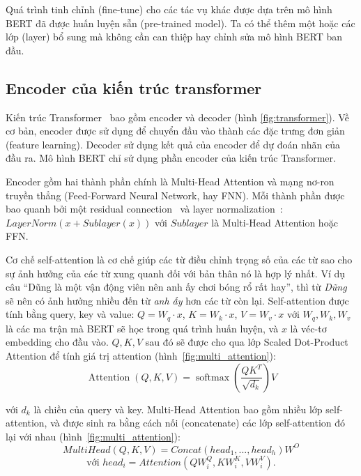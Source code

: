 Quá trình tinh chỉnh (fine-tune) cho các tác vụ khác được dựa trên mô hình BERT đã được huấn luyện sẵn (pre-trained model). Ta có thể thêm một hoặc các lớp (layer) bổ sung mà không cần can thiệp hay chỉnh sửa mô hình BERT ban đầu.

\subsection{Encoder của kiến trúc transformer} Kiến trúc
Transformer~\cite{vaswaniAttentionAllYou2017} bao gồm encoder và decoder (hình \ref{fig:transformer}). Về cơ bản, encoder được sử dụng để chuyển đầu vào thành các đặc trưng đơn giản (feature learning). Decoder sử dụng kết quả của encoder để dự đoán nhãn của đầu ra. Mô hình BERT chỉ sử dụng phần encoder của kiến trúc Transformer.


Encoder gồm hai thành phần chính là Multi-Head Attention và mạng nơ-ron truyền thẳng (Feed-Forward Neural Network, hay FNN). Mỗi thành phần được bao quanh bởi một residual connection~\cite{heDeepResidualLearning2016} và layer normalization~\cite{baLayerNormalization2016}: $LayerNorm(x + Sublayer(x))$ với $Sublayer$ là Multi-Head Attention hoặc FFN.

Cơ chế self-attention là cơ chế giúp các từ điều chỉnh trọng số của các từ sao cho sự ảnh hưởng của các từ xung quanh đối với bản thân nó là hợp lý nhất. Ví dụ câu ``Dũng là một vận động viên nên anh ấy chơi bóng rổ rất hay'', thì từ \textit{Dũng} sẽ nên có ảnh hưởng nhiều đến từ \textit{anh ấy} hơn các từ còn lại. Self-attention được tính bằng query, key và value: $Q = W_q \cdot x$, $K = W_k \cdot x$, $V = W_v \cdot x$ với $W_q, W_k, W_v$ là các ma trận mà BERT sẽ học trong quá trình huấn luyện, và $x$ là véc-tơ embedding cho đầu vào. $Q, K, V$ sau đó sẽ được cho qua lớp Scaled Dot-Product Attention để tính giá trị attention (hình~\ref{fig:multi_attention}):
\[ \operatorname{Attention}(Q, K, V)=\operatorname{softmax}\left(\frac{Q
K^{T}}{\sqrt{d_{k}}}\right) V \]

với $d_k$ là chiều của query và key. Multi-Head Attention bao gồm nhiều lớp self-attention, và được sinh ra bằng cách nối (concatenate) các lớp self-attention đó lại với nhau (hình~\ref{fig:multi_attention}):
\[ MultiHead(Q,K,V) = Concat(head_1,...,head_h)W^O \]
\[ \text{với } head_i = Attention(QW_i^Q, KW_i^K, VW_i^V). \]

